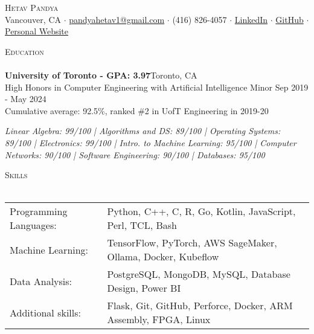 \documentclass[a4paper]{article}
\newcommand{\lineunder} {
    \vspace*{-8pt} \\
    \hspace*{-18pt} \hrulefill \\
}
\newcommand{\header} [1] {
    {\hspace*{-18pt}\vspace*{6pt} \textsc{#1}}
    \vspace*{-6pt} \lineunder
}
\begin{document}
\vspace*{-50pt}



\vspace*{-10pt}
\begin{center}
	{\Huge \scshape {Hetav Pandya}}\\
	Vancouver, CA $\cdot$ \href{mailto:pandyahetav1@gmail.com}{pandyahetav1@gmail.com} $\cdot$ (416) 826-4057 $\cdot$ \href{https://www.linkedin.com/in/hetav-pandya}{LinkedIn} $\cdot$ \href{https://github.com/pandyah5}{GitHub} $\cdot$ \href{https://pandyah5.github.io/terminalresume.github.io/}{Personal Website}\\
\end{center}

\header{Education}
\textbf{University of Toronto - GPA: 3.97}\hfill Toronto, CA\\
High Honors in Computer Engineering with Artificial Intelligence Minor \hfill Sep 2019 - May 2024\\
Cumulative average: 92.5\%, ranked \#2 in UofT Engineering in 2019-20
\linebreak\\
\vspace{-3.5mm}
\begin{footnotesize}
\textit{Linear Algebra: 99/100 | Algorithms and DS: 89/100 | Operating Systems: 89/100 | Electronics: 99/100 | 
 Intro. to Machine Learning: 95/100 | Computer Networks: 90/100 | Software Engineering: 90/100 | Databases: 95/100}
\end{footnotesize}
\vspace{2mm}

\header{Skills}
\begin{small}
\begin{tabular}{ l l }
    Programming Languages: & Python, C++, C, R, Go, Kotlin, JavaScript, Perl, TCL, Bash             \\ 
	Machine Learning:      & TensorFlow, PyTorch, AWS SageMaker, Ollama, Docker, Kubeflow             \\
	Data Analysis:         & PostgreSQL, MongoDB, MySQL, Database Design, Power BI            \\
    Additional skills:     & Flask, Git, GitHub, Perforce, Docker, ARM Assembly, FPGA, Linux                      \\                               
\end{tabular}
\end{small}
\vspace{2mm}
\end{document}
